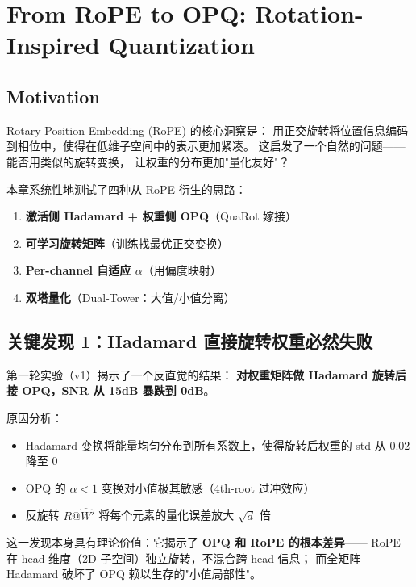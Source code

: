 
\section{From RoPE to OPQ: Rotation-Inspired Quantization}

\subsection{Motivation}

Rotary Position Embedding (RoPE) \cite{rope} 的核心洞察是：
用正交旋转将位置信息编码到相位中，使得在低维子空间中的表示更加紧凑。
这启发了一个自然的问题——能否用类似的旋转变换，
让权重的分布更加"量化友好"？

本章系统性地测试了四种从 RoPE 衍生的思路：
\begin{enumerate}
\item \textbf{激活侧 Hadamard + 权重侧 OPQ}（QuaRot 嫁接）
\item \textbf{可学习旋转矩阵}（训练找最优正交变换）
\item \textbf{Per-channel 自适应 $\alpha$}（用偏度映射）
\item \textbf{双塔量化}（Dual-Tower：大值/小值分离）
\end{enumerate}

\subsection{关键发现 1：Hadamard 直接旋转权重必然失败}

第一轮实验（v1）揭示了一个反直觉的结果：
\textbf{对权重矩阵做 Hadamard 旋转后接 OPQ，SNR 从 15dB 暴跌到 0dB}。

原因分析：
\begin{itemize}
\item Hadamard 变换将能量均匀分布到所有系数上，使得旋转后权重的 std 从 0.02 降至 0
\item OPQ 的 $\alpha < 1$ 变换对小值极其敏感（4th-root 过冲效应）
\item 反旋转 $R @ \hat{W}'$ 将每个元素的量化误差放大 $\sqrt{d}$ 倍
\end{itemize}

这一发现本身具有理论价值：它揭示了 \textbf{OPQ 和 RoPE 的根本差异}——
RoPE 在 head 维度（2D 子空间）独立旋转，不混合跨 head 信息；
而全矩阵 Hadamard 破坏了 OPQ 赖以生存的"小值局部性"。

